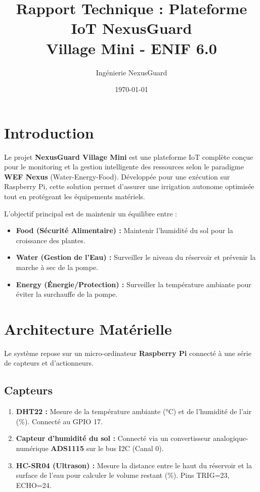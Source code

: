 \documentclass[12pt,a4paper]{article}
\title{Rapport Technique : Plateforme IoT NexusGuard \\ \large Village Mini - ENIF 6.0}
\author{Ingénierie NexusGuard}
\date{\today}
\begin{document}
\maketitle

\tableofcontents
\newpage

\section{Introduction}
Le projet \textbf{NexusGuard Village Mini} est une plateforme IoT complète conçue pour le monitoring et la gestion intelligente des ressources selon le paradigme \textbf{WEF Nexus} (Water-Energy-Food). Développée pour une exécution sur Raspberry Pi, cette solution permet d'assurer une irrigation autonome optimisée tout en protégeant les équipements matériels.

L'objectif principal est de maintenir un équilibre entre :
\begin{itemize}
    \item \textbf{Food (Sécurité Alimentaire) :} Maintenir l'humidité du sol pour la croissance des plantes.
    \item \textbf{Water (Gestion de l'Eau) :} Surveiller le niveau du réservoir et prévenir la marche à sec de la pompe.
    \item \textbf{Energy (Énergie/Protection) :} Surveiller la température ambiante pour éviter la surchauffe de la pompe.
\end{itemize}

\section{Architecture Matérielle}
Le système repose sur un micro-ordinateur \textbf{Raspberry Pi} connecté à une série de capteurs et d'actionneurs.

\subsection{Capteurs}
\begin{enumerate}
    \item \textbf{DHT22 :} Mesure de la température ambiante (°C) et de l'humidité de l'air (\%). Connecté au GPIO 17.
    \item \textbf{Capteur d'humidité du sol :} Connecté via un convertisseur analogique-numérique \textbf{ADS1115} sur le bus I2C (Canal 0).
    \item \textbf{HC-SR04 (Ultrason) :} Mesure la distance entre le haut du réservoir et la surface de l'eau pour calculer le volume restant (\%). Pins TRIG=23, ECHO=24.
\end{enumerate}
\end{document}
